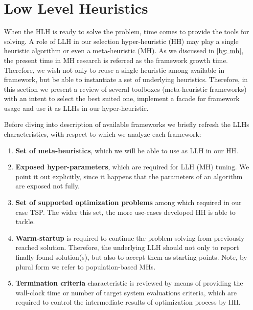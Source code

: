 \section{Low Level Heuristics}\label{impl: LLH}
When the HLH is ready to solve the problem, time comes to provide the tools for solving. A role of LLH in our selection hyper-heuristic (HH) may play a single heuristic algorithm or even a meta-heuristic (MH). As we discussed in \cref{bg: mh}, the present time in MH research is referred as the framework growth time. Therefore, we wish not only to reuse a single heuristic among available in framework, but be able to instantiate a set of underlying heuristics. Therefore, in this section we present a review of several toolboxes (meta-heuristic frameworks) with an intent to select the best suited one, implement a facade for framework usage and use it as LLHs in our hyper-heuristic.

Before diving into description of available frameworks we briefly refresh the LLHs characteristics, with respect to which we analyze each framework:
\begin{enumerate}
	\item \textbf{Set of meta-heuristics}, which we will be able to use as LLH in our HH.
	
	\item \textbf{Exposed hyper-parameters}, which are required for LLH (MH) tuning. We point it out explicitly, since it happens that the parameters of an algorithm are exposed not fully.
	
	\item \textbf{Set of supported optimization problems} among which required in our case TSP. The wider this set, the more use-cases developed HH is able to tackle.
	
	\item \textbf{Warm-startup} is required to continue the problem solving from previously reached solution. Therefore, the underlying LLH should not only to report finally found solution(s), but also to accept them as starting points. Note, by plural form we refer to population-based MHs.
	
	\item \textbf{Termination criteria} characteristic is reviewed by means of providing the wall-clock time or number of target system evaluations criteria, which are required to control the intermediate results of optimization process by HH.
\end{enumerate}


